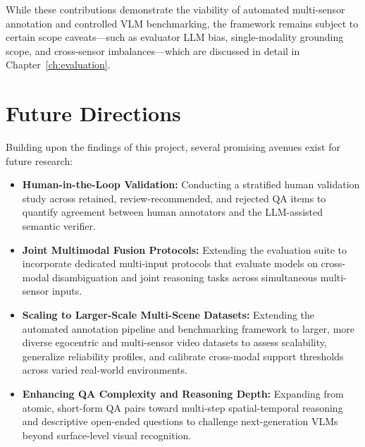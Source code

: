 While these contributions demonstrate the viability of automated multi-sensor
annotation and controlled VLM benchmarking, the framework remains subject to certain
scope caveats—such as evaluator LLM bias, single-modality grounding scope, and
cross-sensor imbalances—which are discussed in detail in Chapter~\ref{ch:evaluation}.


\section{Future Directions}
\label{sec:conclusion_future_work}

Building upon the findings of this project, several promising avenues exist for future research:

\begin{itemize}
    \item \textbf{Human-in-the-Loop Validation:} Conducting a stratified human
          validation study across retained, review-recommended, and rejected QA
          items to quantify agreement between human annotators and the LLM-assisted
          semantic verifier.

    \item \textbf{Joint Multimodal Fusion Protocols:} Extending the evaluation suite to
          incorporate dedicated multi-input protocols that evaluate models on
          cross-modal disambiguation and joint reasoning tasks across simultaneous
          multi-sensor inputs.

    \item \textbf{Scaling to Larger-Scale Multi-Scene Datasets:} Extending the
          automated annotation pipeline and benchmarking framework to larger,
          more diverse egocentric and multi-sensor video datasets to assess
          scalability, generalize reliability profiles, and calibrate cross-modal
          support thresholds across varied real-world environments.

    \item \textbf{Enhancing QA Complexity and Reasoning Depth:} Expanding from
          atomic, short-form QA pairs toward multi-step spatial-temporal reasoning
          and descriptive open-ended questions to challenge next-generation VLMs
          beyond surface-level visual recognition.
\end{itemize}
